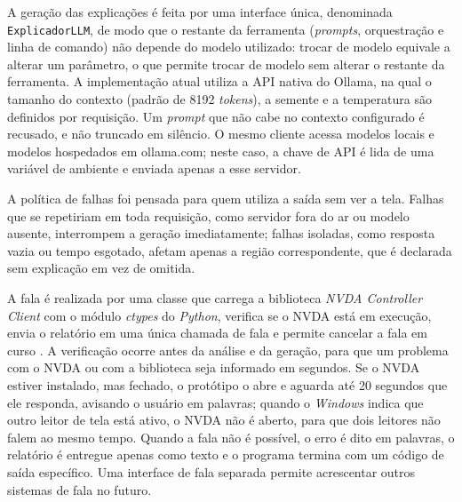\documentclass[
    12pt,                   %
    openright,              %
    oneside,                %
    a4paper,                %
    sumario=tradicional,    %
    english,                %
    brazil,                 %
    ]{abntex2}
\begin{document}
A geração das explicações é feita por uma interface única, denominada \texttt{Explicador\-LLM}, de modo que o restante da ferramenta (\textit{prompts}, orquestração e linha de comando) não depende do modelo utilizado: trocar de modelo equivale a alterar um parâmetro, o que permite trocar de modelo sem alterar o restante da ferramenta. A implementação atual utiliza a API nativa do Ollama, na qual o tamanho do contexto (padrão de 8192 \textit{tokens}), a semente e a temperatura são definidos por requisição. Um \textit{prompt} que não cabe no contexto configurado é recusado, e não truncado em silêncio. O mesmo cliente acessa modelos locais e modelos hospedados em ollama.com; neste caso, a chave de API é lida de uma variável de ambiente e enviada apenas a esse servidor.

A política de falhas foi pensada para quem utiliza a saída sem ver a tela. Falhas que se repetiriam em toda requisição, como servidor fora do ar ou modelo ausente, interrompem a geração imediatamente; falhas isoladas, como resposta vazia ou tempo esgotado, afetam apenas a região correspondente, que é declarada sem explicação em vez de omitida.

A fala é realizada por uma classe que carrega a biblioteca \textit{NVDA Controller Client} com o módulo \textit{ctypes} do \textit{Python}, verifica se o NVDA está em execução, envia o relatório em uma única chamada de fala e permite cancelar a fala em curso \cite{nvaccess2024controller}. A verificação ocorre antes da análise e da geração, para que um problema com o NVDA ou com a biblioteca seja informado em segundos. Se o NVDA estiver instalado, mas fechado, o protótipo o abre e aguarda até 20 segundos que ele responda, avisando o usuário em palavras; quando o \textit{Windows} indica que outro leitor de tela está ativo, o NVDA não é aberto, para que dois leitores não falem ao mesmo tempo. Quando a fala não é possível, o erro é dito em palavras, o relatório é entregue apenas como texto e o programa termina com um código de saída específico. Uma interface de fala separada permite acrescentar outros sistemas de fala no futuro.
\end{document}
